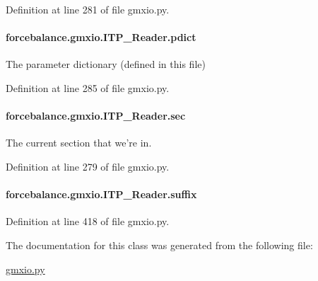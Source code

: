 Definition at line 281 of file gmxio.\-py.

\hypertarget{classforcebalance_1_1gmxio_1_1ITP__Reader_a1c74f6a71b392ecbf20ccc1e12b0d321}{
\paragraph[{pdict}]{\setlength{\rightskip}{0pt plus 5cm}forcebalance.\-gmxio.\-I\-T\-P\-\_\-\-Reader.\-pdict}}\label{classforcebalance_1_1gmxio_1_1ITP__Reader_a1c74f6a71b392ecbf20ccc1e12b0d321}


The parameter dictionary (defined in this file) 



Definition at line 285 of file gmxio.\-py.

\hypertarget{classforcebalance_1_1gmxio_1_1ITP__Reader_a744b1698c9ccfc1be470d83862099551}{
\paragraph[{sec}]{\setlength{\rightskip}{0pt plus 5cm}forcebalance.\-gmxio.\-I\-T\-P\-\_\-\-Reader.\-sec}}\label{classforcebalance_1_1gmxio_1_1ITP__Reader_a744b1698c9ccfc1be470d83862099551}


The current section that we're in. 



Definition at line 279 of file gmxio.\-py.

\hypertarget{classforcebalance_1_1gmxio_1_1ITP__Reader_a147438dd2683af88b92b659c96162848}{
\paragraph[{suffix}]{\setlength{\rightskip}{0pt plus 5cm}forcebalance.\-gmxio.\-I\-T\-P\-\_\-\-Reader.\-suffix}}\label{classforcebalance_1_1gmxio_1_1ITP__Reader_a147438dd2683af88b92b659c96162848}


Definition at line 418 of file gmxio.\-py.



The documentation for this class was generated from the following file\-:\begin{DoxyCompactItemize}
\item 
\hyperlink{gmxio_8py}{gmxio.\-py}\end{DoxyCompactItemize}
